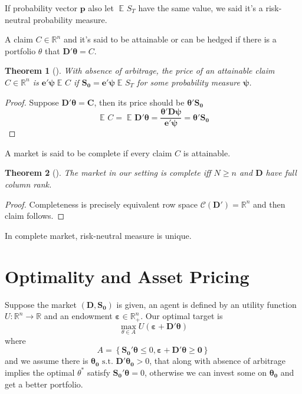 \documentclass[
  12pt,
  oneside]{book}
\newcommand{\bm}[1]{\symbf{#1}}
\newtheorem{theorem}{Theorem}[chapter]
\theoremstyle{definition}
\theoremstyle{definition}
\theoremstyle{definition}
\theoremstyle{definition}
\theoremstyle{remark}
\begin{document}
If probability vector \(\bm{p}\) also let \(\mathop{{}\mathbb{E}}_{}S_{T}\) have the same value, we said it's a risk-neutral probability measure.

A claim \(C\in \mathbb{R}^{n}\) and it's said to be attainable or can be hedged if there is a portfolio \(\theta\) that \(\bm{D'\theta}=C\).

\begin{theorem}[]
With absence of arbitrage, the price of an attainable claim \(C\in \mathbb{R}^{n}\) is \(\bm{e'\psi}\mathop{{}\mathbb{E}}_{}C\) if \(\bm{S_0}=\bm{e'\psi}\mathop{{}\mathbb{E}}_{}S_T\) for some probability measure \(\bm{\psi}\).
\end{theorem}

\begin{proof}
Suppose \(\bm{D'\theta=C}\), then its price should be \(\bm{\theta'S_0}\)
\[
\mathop{{}\mathbb{E}}_{}C=\mathop{{}\mathbb{E}}_{}\bm{D'\theta}=\frac{\bm{\theta'D\psi}}{\bm{e'\psi}}=\bm{\theta' S_0}
\]
\end{proof}

A market is said to be complete if every claim \(C\) is attainable.

\begin{theorem}[]
The market in our setting is complete iff \(N\ge n\) and \(\bm{D}\) have full column rank.
\end{theorem}

\begin{proof}
Completeness is precisely equivalent row space \(\mathcal{C}(\bm{D'})=\mathbb{R}^{n}\) and then claim follows.
\end{proof}

In complete market, risk-neutral measure is unique.

\hypertarget{optimality-and-asset-pricing}{%
\section{Optimality and Asset Pricing}\label{optimality-and-asset-pricing}}

Suppose the market \((\bm{D,S_0})\) is given, an agent is defined by an utility function \(U:\mathbb{R}^{n}\to \mathbb{R}\) and an endowment \(\bm{\varepsilon}\in \mathbb{R}^{n}_{+}\). Our optimal target is
\[
\max _{\theta \in A} U(\bm{\varepsilon+D'\theta}) 
\]
where
\[
A=\left\{ \bm{S_0'\theta}\le 0, \bm{\varepsilon+D'\theta \ge  0} \right\}
\]
and we assume there is \(\bm{\theta _0} \text{ s.t. } \bm{D'\theta_0}>0\), that along with absence of arbitrage implies the optimal \(\theta^*\) satisfy \(\bm{S_0'\theta}=0\), otherwise we can invest some on \(\bm{\theta_0}\) and get a better portfolio.
\end{document}
